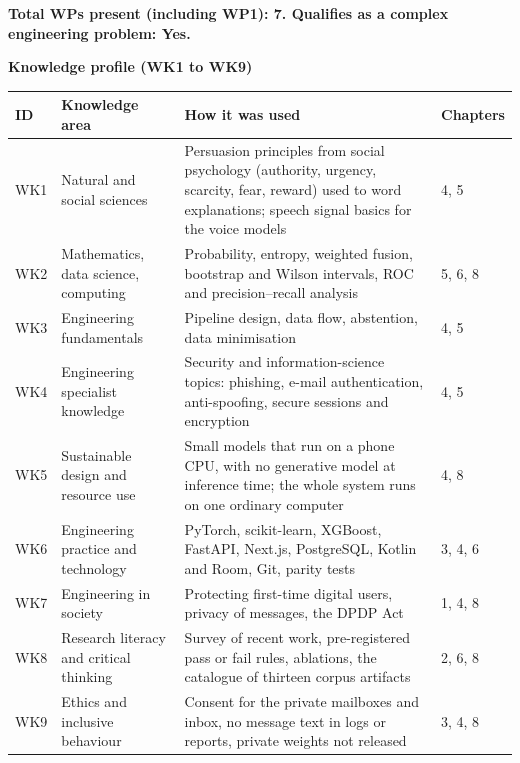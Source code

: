 \noindent\textbf{Total WPs present (including WP1): 7. Qualifies as a complex engineering problem: Yes.}

\vspace{0.4cm}
\noindent\textbf{\large Knowledge profile (WK1 to WK9)}\\[0.2cm]
{\small{}
\begin{longtable}{|p{1.1cm}|p{3.9cm}|p{6.7cm}|p{2.2cm}|}
\hline \textbf{ID} & \textbf{Knowledge area} & \textbf{How it was used} & \textbf{Chapters} \\ \hline
\endhead
WK1 & Natural and social sciences & Persuasion principles from social psychology (authority, urgency, scarcity, fear, reward) used to word explanations; speech signal basics for the voice models & 4, 5 \\ \hline
WK2 & Mathematics, data science, computing & Probability, entropy, weighted fusion, bootstrap and Wilson intervals, ROC and precision--recall analysis & 5, 6, 8 \\ \hline
WK3 & Engineering fundamentals & Pipeline design, data flow, abstention, data minimisation & 4, 5 \\ \hline
WK4 & Engineering specialist knowledge & Security and information-science topics: phishing, e-mail authentication, anti-spoofing, secure sessions and encryption & 4, 5 \\ \hline
WK5 & Sustainable design and resource use & Small models that run on a phone CPU, with no generative model at inference time; the whole system runs on one ordinary computer & 4, 8 \\ \hline
WK6 & Engineering practice and technology & PyTorch, scikit-learn, XGBoost, FastAPI, Next.js, PostgreSQL, Kotlin and Room, Git, parity tests & 3, 4, 6 \\ \hline
WK7 & Engineering in society & Protecting first-time digital users, privacy of messages, the DPDP Act & 1, 4, 8 \\ \hline
WK8 & Research literacy and critical thinking & Survey of recent work, pre-registered pass or fail rules, ablations, the catalogue of thirteen corpus artifacts & 2, 6, 8 \\ \hline
WK9 & Ethics and inclusive behaviour & Consent for the private mailboxes and inbox, no message text in logs or reports, private weights not released & 3, 4, 8 \\ \hline
\end{longtable}
}
